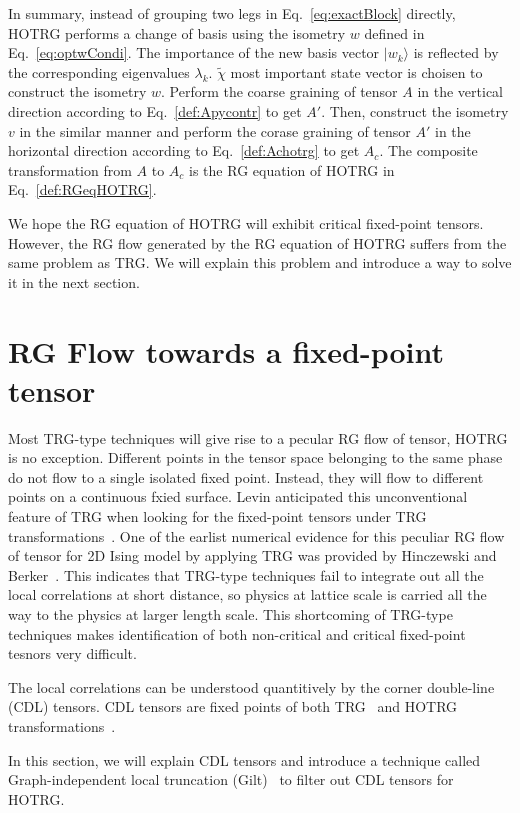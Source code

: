 \documentclass[aps,prb,reprint,superscriptaddress]{revtex4-2}
\newcommand{\ket}[1]{|#1\rangle}
\begin{document}
In summary, instead of grouping two legs in Eq.~\eqref{eq:exactBlock}
directly, HOTRG performs a change of basis using the isometry $w$
defined in Eq.~\eqref{eq:optwCondi}. The importance of the new basis
vector $\ket{w_k}$ is reflected by the corresponding eigenvalues
$\lambda_k$.  $\tilde{\chi}$ most important state vector is choisen to
construct the isometry $w$. Perform the coarse graining of tensor $A$ in
the vertical direction according to Eq.~\eqref{def:Apycontr} to get
$A'$. Then, construct the isometry $v$ in the similar manner and perform
the corase graining of tensor $A'$ in the horizontal direction according
to Eq.~\eqref{def:Achotrg} to get $A_c$. The composite transformation
from $A$ to $A_c$ is the RG equation of HOTRG in
Eq.~\eqref{def:RGeqHOTRG}.
%

We hope the RG equation of HOTRG will exhibit critical fixed-point
tensors. However, the RG flow generated by the RG equation of HOTRG
suffers from the same problem as TRG. We will explain this problem and
introduce a way to solve it in the next section.


\section{RG Flow towards a fixed-point
tensor\label{fixRGflow}}
Most TRG-type techniques will give rise to a pecular RG flow of tensor,
HOTRG is no exception. Different points in the tensor space belonging to
the same phase do not flow to a single isolated fixed point. Instead,
they will flow to different points on a continuous fxied surface. Levin
anticipated this unconventional feature of TRG when looking for the
fixed-point tensors under TRG transformations~\cite{LevinTalk}. One of
the earlist numerical evidence for this peculiar RG flow of tensor for
2D Ising model by applying TRG was provided by Hinczewski and
Berker~\cite{Berker2008}. This indicates that TRG-type techniques fail
to integrate out all the local correlations at short distance, so physics at
lattice scale is carried all the way to the physics at larger length
scale. This shortcoming of TRG-type techniques makes identification of
both non-critical and critical fixed-point tesnors very difficult.
%

The local correlations can be understood quantitively by the
corner double-line (CDL) tensors. CDL tensors are fixed points of both
TRG~\cite{LevinTalk,GuWen2009,tnr,gilts} and HOTRG
transformations~\cite{hotrgfixpoint}.

In this section, we will explain CDL tensors and introduce a technique
called Graph-independent local truncation (Gilt)~\cite{gilts} to filter
out CDL tensors for HOTRG.
\end{document}

